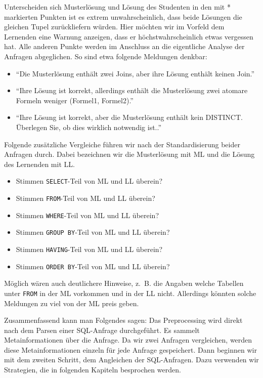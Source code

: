 Unterscheiden sich Musterlösung und Lösung des Studenten in den mit * markierten Punkten ist es extrem unwahrscheinlich, dass beide Lösungen die gleichen Tupel zurückliefern würden. Hier möchten wir im Vorfeld dem Lernenden eine Warnung anzeigen, dass er höchstwahrscheinlich etwas vergessen hat. Alle anderen Punkte werden im Anschluss an die eigentliche Analyse der Anfragen abgeglichen. So sind etwa folgende Meldungen denkbar:

\begin{itemize}
\item ``Die Musterlösung enthält zwei Joins, aber ihre Lösung enthält keinen Join.''
\item ``Ihre Lösung ist korrekt, allerdings enthält die Musterlösung zwei atomare Formeln weniger (Formel1, Formel2).''
\item ``Ihre Lösung ist korrekt, aber die Musterlösung enthält kein DISTINCT. Überlegen Sie, ob dies wirklich notwendig ist..''
\end{itemize}

Folgende zusätzliche Vergleiche führen wir nach der Standardisierung beider Anfragen durch. Dabei bezeichnen wir die Musterlösung mit ML und die Lösung des Lernenden mit LL.

\begin{itemize}
\item Stimmen \verb|SELECT|-Teil von ML und LL überein?
\item Stimmen \verb|FROM|-Teil von ML und LL überein?
\item Stimmen \verb|WHERE|-Teil von ML und LL überein?
\item Stimmen \verb|GROUP BY|-Teil von ML und LL überein?
\item Stimmen \verb|HAVING|-Teil von ML und LL überein?
\item Stimmen \verb|ORDER BY|-Teil von ML und LL überein?
\end{itemize}

Möglich wären auch deutlichere Hinweise, \mbox{z. B.} die Angaben welche Tabellen unter \verb|FROM| in der ML vorkommen und in der LL nicht. Allerdings könnten solche Meldungen zu viel von der ML preis geben.


Zusammenfassend kann man Folgendes sagen: Das Preprocessing wird direkt nach dem Parsen einer SQL-Anfrage durchgeführt. Es sammelt Metainformationen über die Anfrage. Da wir zwei Anfragen vergleichen, werden diese Metainformationen einzeln für jede Anfrage gespeichert. Dann beginnen wir mit dem zweiten Schritt, dem Angleichen der SQL-Anfragen. Dazu verwenden wir Strategien, die in folgenden Kapiteln besprochen werden.

